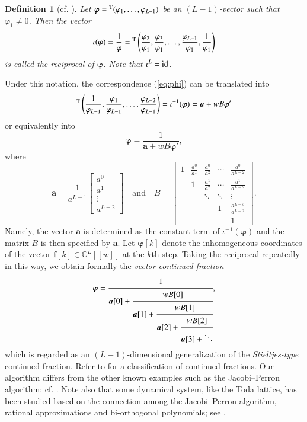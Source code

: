\documentclass[12pt]{article}
\newtheorem{dfn}[thm]{Definition}
\numberwithin{equation}{section}
\def\id{{\rm id}}
\begin{document}
\begin{dfn}[cf. \cite{ns91, par81}]\rm
Let
${\boldsymbol \varphi}={}^{\rm T}(\varphi_1,\ldots,\varphi_{L-1})$ 
be an $(L-1)$-vector
such that $\varphi_1\neq 0$.
Then the vector
\[
\iota({\boldsymbol \varphi})=\frac{1}{{\boldsymbol \varphi}}=
{}^{\rm T}
\left( \frac{\varphi_2}{\varphi_1}, \frac{\varphi_3}{\varphi_1}, \ldots,  \frac{\varphi_{L-1}}{\varphi_1},  \frac{1}{\varphi_1} \right)
\]
is called the {\it reciprocal of ${\boldsymbol \varphi}$}.
Note that  $\iota^L=\id$.
\end{dfn}


Under this notation, 
the correspondence (\ref{eq:phi}) can be translated into
\[
{}^{\rm T}\left(\frac{1}{\varphi_{L-1}}, \frac{\varphi_1}{\varphi_{L-1}}, \ldots,\frac{\varphi_{L-2}}{\varphi_{L-1}}\right)
=\iota^{-1}( {\boldsymbol \varphi} )=
{\boldsymbol a}+ w B {\boldsymbol \varphi'}
\]
or equivalently into
\[
{\boldsymbol \varphi}=\frac{1}{{\boldsymbol a}+ w B{\boldsymbol \varphi'} },
\]
where
\[
{\boldsymbol a}= 
\frac{1}{a^{L-1}}
\begin{bmatrix}
a^0 \\ a^1\\
\vdots    \\ 
a^{L-2}
\end{bmatrix}
\quad \text{and} \quad
B= \begin{bmatrix}
1 & \frac{a^0}{a^1} & \frac{a^0}{a^2} &\cdots & \frac{a^0}{a^{L-2}}  
\\ 
& 1 & \frac{a^1}{a^2} &\cdots & \frac{a^1}{a^{L-2}}  
\\
&&\ddots&\ddots&\vdots
 \\ 
&&& 1 & \frac{a^{L-3}}{a^{L-2}}
\\
&&&&1
\end{bmatrix}.
\]
Namely,
the vector
${\boldsymbol a}$ is determined as
the constant term of $\iota^{-1}({\boldsymbol \varphi})$
and the matrix $B$ is then specified by ${\boldsymbol a}$.
Let 
${\boldsymbol \varphi}[k]$ denote the inhomogeneous coordinates 
of the vector ${\boldsymbol f}[k] \in  {\mathbb C}^{L}[\![w]\!]$
at the $k$th step.
Taking the reciprocal repeatedly in this way,
we obtain formally the {\it vector continued fraction}
\begin{equation} \label{eq:stiel}
{\boldsymbol \varphi}= \cfrac{1}{{\boldsymbol a}[0] + \cfrac{ w B[0]}{ {\boldsymbol a}[1] + \cfrac{ w B[1]}{ {\boldsymbol a}[2] + \cfrac{w B[2]}{ {\boldsymbol a}[3] +\ddots} }  }},
\end{equation}
which is regarded as an $(L-1)$-dimensional generalization 
of the {\it Stieltjes-type} continued fraction.
Refer to \cite[Appendix A]{jt09} for a classification of continued fractions.
Our algorithm
differs from the other
known examples
such as 
the
Jacobi--Perron algorithm;
cf. \cite{par81, per07}. 
Note also that some dynamical system, like the Toda lattice, 
has been studied
based on the connection among 
the Jacobi--Perron algorithm, 
rational approximations and bi-orthogonal polynomials; see \cite{ka84}.
\end{document}
